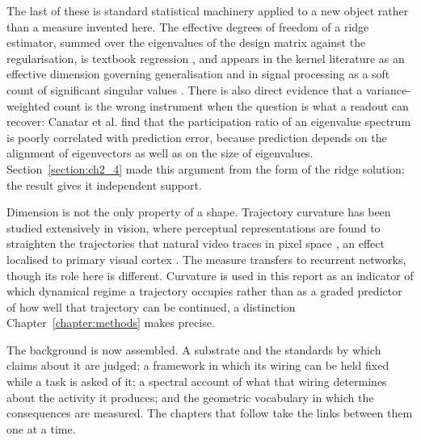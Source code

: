 The last of these is standard statistical machinery applied to a new object rather than a
measure invented here. The effective degrees of freedom of a ridge estimator, summed over
the eigenvalues of the design matrix against the regularisation, is textbook regression
\cite{hastie1990generalized, hastie2009elements}, and appears in the kernel literature as an
effective dimension governing generalisation \cite{zhang2005learning, caponnetto2007optimal}
and in signal processing as a soft count of significant singular values
\cite{roy2007effective}. There is also direct evidence that a variance-weighted count is the
wrong instrument when the question is what a readout can recover: Canatar et al.
\cite{canatar2023spectral} find that the participation ratio of an eigenvalue spectrum is
poorly correlated with prediction error, because prediction depends on the alignment of
eigenvectors as well as on the size of eigenvalues. Section~\ref{section:ch2_4} made this
argument from the form of the ridge solution; the result gives it independent support.
 
Dimension is not the only property of a shape. Trajectory curvature has been studied
extensively in vision, where perceptual representations are found to straighten the
trajectories that natural video traces in pixel space \cite{henaff2019perceptual}, an effect
localised to primary visual cortex \cite{henaff2021primary}. The measure transfers to
recurrent networks, though its role here is different. Curvature is used in this report as
an indicator of which dynamical regime a trajectory occupies rather than as a graded
predictor of how well that trajectory can be continued, a distinction
Chapter~\ref{chapter:methods} makes precise.
 
The background is now assembled. A substrate and the standards by which claims about it are
judged; a framework in which its wiring can be held fixed while a task is asked of it; a
spectral account of what that wiring determines about the activity it produces; and the
geometric vocabulary in which the consequences are measured. The chapters that follow take
the links between them one at a time. 